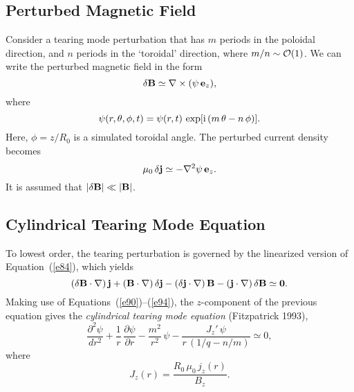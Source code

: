 \documentclass[notitlepage,12pt]{article}
\begin{document}
\subsection{Perturbed Magnetic Field}
Consider a tearing mode perturbation that has $m$ periods in the poloidal direction,
and $n$ periods in the `toroidal' direction, where $m/n\sim {\cal O}(1)$.  We can write the perturbed magnetic field in the form
\begin{equation}\label{e93}
\delta{\bf B} \simeq \nabla\times (\psi\,{\bf e}_z),
\end{equation}
where
\begin{equation}\label{e93a}
\psi(r,\theta,\phi,t)= \psi(r,t)\,\exp[{\rm i}\,(m\,\theta-n\,\phi)].
\end{equation}
Here, $\phi=z/R_0$ is a simulated toroidal angle. The perturbed current density becomes
\begin{equation}\label{e94}
\mu_0\,\delta {\bf j} \simeq - \nabla^2\psi\,{\bf e}_z.
\end{equation}
It is assumed that $|\delta{\bf B}|\ll |{\bf B}|$. 

\subsection{Cylindrical Tearing Mode Equation}
To lowest order, the tearing perturbation is governed by the linearized version of Equation~(\ref{e84}), which yields
\begin{equation}\label{e96}
(\delta{\bf B}\cdot \nabla)\,{\bf j} + ({\bf B}\cdot\nabla)\,\delta{\bf j} - (\delta{\bf j}\cdot\nabla)\,{\bf B} - 
({\bf j}\cdot\nabla)\,\delta {\bf B}\simeq {\bf 0}.
\end{equation}
Making use of Equations~(\ref{e90})--(\ref{e94}), the $z$-component of the previous equation gives
the {\em cylindrical tearing mode equation}\/ (Fitzpatrick 1993),
\begin{equation}
\frac{\partial^2\psi}{dr^2} + \frac{1}{r}\,\frac{\partial\psi}{\partial r}-\frac{m^2}{r^2}\,\psi - \frac{J_z'\,\psi}{r\,(1/q-n/m)}\simeq 0,
\end{equation}
where 
\begin{equation}
J_z(r)= \frac{R_0\,\mu_0\,j_z(r)}{B_z}.
\end{equation}
\end{document}
